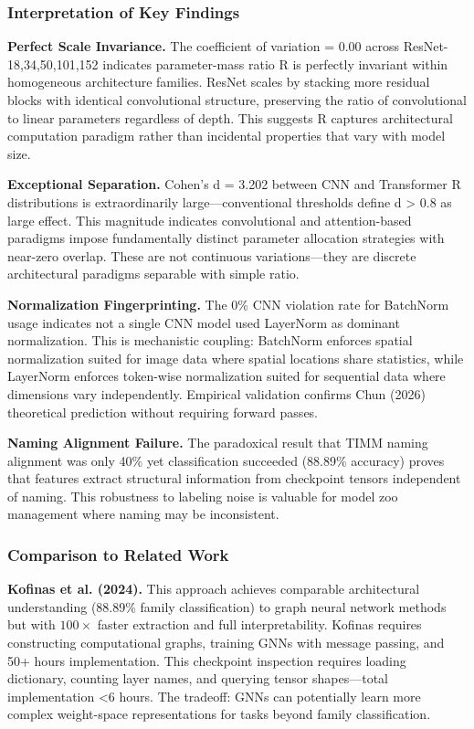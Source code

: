
\subsubsection{Interpretation of Key Findings}

\textbf{Perfect Scale Invariance.} The coefficient of variation = 0.00 across ResNet-{18,34,50,101,152} indicates parameter-mass ratio R is perfectly invariant within homogeneous architecture families. ResNet scales by stacking more residual blocks with identical convolutional structure, preserving the ratio of convolutional to linear parameters regardless of depth. This suggests R captures architectural computation paradigm rather than incidental properties that vary with model size.

\textbf{Exceptional Separation.} Cohen's d = 3.202 between CNN and Transformer R distributions is extraordinarily large---conventional thresholds define d > 0.8 as large effect. This magnitude indicates convolutional and attention-based paradigms impose fundamentally distinct parameter allocation strategies with near-zero overlap. These are not continuous variations---they are discrete architectural paradigms separable with simple ratio.

\textbf{Normalization Fingerprinting.} The 0\% CNN violation rate for BatchNorm usage indicates not a single CNN model used LayerNorm as dominant normalization. This is mechanistic coupling: BatchNorm enforces spatial normalization suited for image data where spatial locations share statistics, while LayerNorm enforces token-wise normalization suited for sequential data where dimensions vary independently. Empirical validation confirms Chun (2026) theoretical prediction without requiring forward passes.

\textbf{Naming Alignment Failure.} The paradoxical result that TIMM naming alignment was only 40\% yet classification succeeded (88.89\% accuracy) proves that features extract structural information from checkpoint tensors independent of naming. This robustness to labeling noise is valuable for model zoo management where naming may be inconsistent.

\subsubsection{Comparison to Related Work}

\textbf{Kofinas et al. (2024).} This approach achieves comparable architectural understanding (88.89\% family classification) to graph neural network methods but with $100\times$ faster extraction and full interpretability. Kofinas requires constructing computational graphs, training GNNs with message passing, and 50+ hours implementation. This checkpoint inspection requires loading dictionary, counting layer names, and querying tensor shapes---total implementation <6 hours. The tradeoff: GNNs can potentially learn more complex weight-space representations for tasks beyond family classification.

